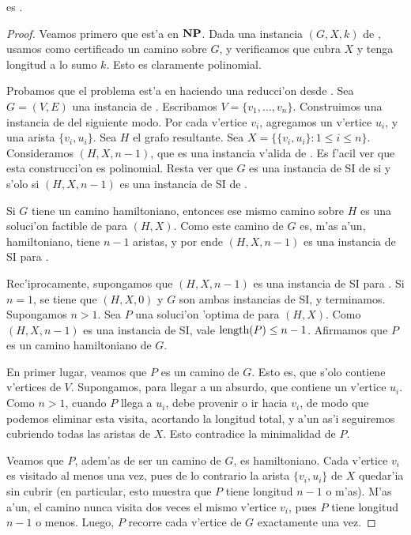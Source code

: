 \begin{theorem}
\label{th:sr_npc}
 es .

\begin{proof}
Veamos primero que est'a en $\textnormal{\textbf{NP}}$. Dada una instancia $(G, X, k)$ de , usamos como certificado un camino sobre $G$, y verificamos que cubra $X$ y tenga longitud a lo sumo $k$. Esto es claramente polinomial.

Probamos que el problema est'a en  haciendo una reducci'on desde . Sea $G = (V, E)$ una instancia de . Escribamos $V = \{v_1, \dots, v_n\}$. Construimos una instancia de  del siguiente modo. Por cada v'ertice $v_i$, agregamos un v'ertice $u_i$, y una arista $\{v_i, u_i\}$. Sea $H$ el grafo resultante. Sea $X = \{\{v_i, u_i\}: 1 \leq i \leq n\}$. Consideramos $(H, X, n - 1)$, que es una instancia v'alida de . Es f'acil ver que esta construcci'on es polinomial. Resta ver que $G$ es una instancia de SI de  si y s'olo si $(H, X, n - 1)$ es una instancia de SI de .

Si $G$ tiene un camino hamiltoniano, entonces ese mismo camino sobre $H$ es una soluci'on factible de  para $(H, X)$. Como este camino de $G$ es, m'as a'un, hamiltoniano, tiene $n - 1$ aristas, y por ende $(H, X, n - 1)$ es una instancia de SI para .

Rec'iprocamente, supongamos que $(H, X, n - 1)$ es una instancia de SI para . Si $n = 1$, se tiene que $(H, X, 0)$ y $G$ son ambas instancias de SI, y terminamos. Supongamos $n > 1$. Sea $P$ una soluci'on 'optima de  para $(H, X)$. Como $(H, X, n - 1)$ es una instancia de SI, vale $\textnormal{length}(P) \leq n - 1$. Afirmamos que $P$ es un camino hamiltoniano de $G$.

En primer lugar, veamos que $P$ es un camino de $G$. Esto es, que s'olo contiene v'ertices de $V$. Supongamos, para llegar a un absurdo, que contiene un v'ertice $u_i$. Como $n > 1$, cuando $P$ llega a $u_i$, debe provenir o ir hacia $v_i$, de modo que podemos eliminar esta visita, acortando la longitud total, y a'un as'i seguiremos cubriendo todas las aristas de $X$. Esto contradice la minimalidad de $P$.

Veamos que $P$, adem'as de ser un camino de $G$, es hamiltoniano. Cada v'ertice $v_i$ es visitado al menos una vez, pues de lo contrario la arista $\{v_i, u_i\}$ de $X$ quedar'ia sin cubrir (en particular, esto muestra que $P$ tiene longitud $n - 1$ o m'as). M'as a'un, el camino nunca visita dos veces el mismo v'ertice $v_i$, pues $P$ tiene longitud $n - 1$ o menos. Luego, $P$ recorre cada v'ertice de $G$ exactamente una vez.
\end{proof}
\end{theorem}

